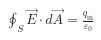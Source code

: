 \documentclass[preview]{standalone}
\begin{document}
\begin{align*}
\oint_S \vec{E} \cdot d\vec{A} = \frac{q_{\text{in}}}{\varepsilon_0}
\end{align*}
\end{document}
